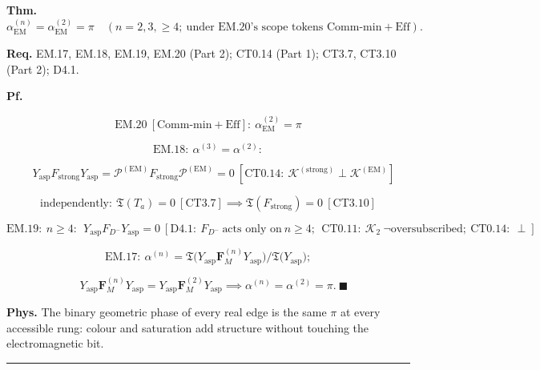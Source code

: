 \begin{theorem}\label{tag:FT-9}
\textbf{Thm.} $ \alpha_{\mathrm{EM}}^{(n)}=\alpha_{\mathrm{EM}}^{(2)}=\pi\quad(n=2,3,\ge4;\ \text{under EM.20's scope tokens Comm-min}+\text{Eff}).$

\textbf{Req.} EM.17, EM.18, EM.19, EM.20 (Part 2); CT0.14 (Part 1); CT3.7, CT3.10 (Part 2); D4.1.

\textbf{Pf.}

\[
\mathrm{EM.20}\ [\text{Comm-min}+\text{Eff}]:\ \alpha_{\mathrm{EM}}^{(2)}=\pi
\]

\[
\mathrm{EM.18}:\ \alpha^{(3)}=\alpha^{(2)}:
\]

\[
\quad Y_{\mathrm{asp}}F_{\mathrm{strong}}Y_{\mathrm{asp}}=\mathcal P^{(\mathrm{EM})}F_{\mathrm{strong}}\mathcal P^{(\mathrm{EM})}=0\ [\mathrm{CT0.14}:\ \mathcal K^{(\mathrm{strong})}\perp\mathcal K^{(\mathrm{EM})}]
\]

\[
\text{independently}:\ \mathfrak T(T_a)=0\ [\mathrm{CT3.7}]\implies\mathfrak T(F_{\mathrm{strong}})=0\ [\mathrm{CT3.10}]
\]

\[
\mathrm{EM.19}:\ n\ge4:\ \ Y_{\mathrm{asp}}F_{D^-}Y_{\mathrm{asp}}=0\ [\mathrm{D4.1}:\ F_{D^-}\ \text{acts only on}\ n\ge4;\ \ \mathrm{CT0.11}:\ \mathcal K_2\ \neg\text{oversubscribed};\ \mathrm{CT0.14}:\ \perp]
\]

\[
\mathrm{EM.17}:\ \alpha^{(n)}=\mathfrak T\bigl(Y_{\mathrm{asp}}\mathbf F_M^{(n)}Y_{\mathrm{asp}}\bigr)/\mathfrak T\bigl(Y_{\mathrm{asp}}\bigr);
\]

\[
\quad Y_{\mathrm{asp}}\mathbf F_M^{(n)}Y_{\mathrm{asp}}=Y_{\mathrm{asp}}\mathbf F_M^{(2)}Y_{\mathrm{asp}}\implies\alpha^{(n)}=\alpha^{(2)}=\pi.\ \blacksquare
\]

\textbf{Phys.} The binary geometric phase of every real edge is the same $\pi$ at every accessible rung: colour and saturation add structure without touching the electromagnetic bit.

\vspace{2pt}\noindent\rule{\textwidth}{0.4pt}\vspace{2pt}

\end{theorem}

